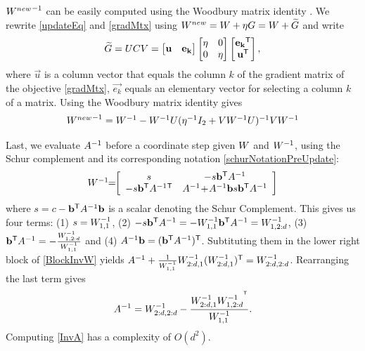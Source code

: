 \documentclass{article}
\begin{document}
${{W^{new}}}^{-1}$ can be easily computed using the Woodbury matrix
identity \cite{woodbury1950inverting}. We rewrite \eqref{updateEq} and \eqref{gradMtx} using ${{W^{new}}} = {W} + \eta G = {W}+{\widetilde{G}}$
and write
\begin{equation}
  {\widetilde{G}} = {U}{C}{V} = \left[ \begin{matrix}
      \mathbf{u} & \mathbf{e_k} \end{matrix} \right] \left[ \begin{matrix}
      \eta & 0 \\ 0 & \eta \end{matrix} \right] \left[ \begin{matrix}
      \mathbf{e_k}{}^\mathsf{T} \\ \mathbf{u}{}^\mathsf{T} \end{matrix} \right],
  \label{gradMtxWDB}
\end{equation}
where $\vec{u}$ is a column vector that equals the column $k$ of the gradient matrix of the objective \eqref{gradMtx},
$\vec{e_k}$ equals an elementary vector for selecting a column $k$ of
a matrix. 
Using the Woodbury matrix identity gives 
\begin{equation}
    \begin{array}{lcl}
    {{W^{new}}}^{-1} = 
    {W}^{-1} - {W}^{-1} {U} (\eta^{-1} I_2 + {V}     {W}^{-1} {U})^{-1} {V} {W}^{-1}
    \end{array}
    \label{InvWwdb}
\end{equation}

Last, we evaluate $A^{-1}$ before a coordinate step given ${W}$
and ${W}^{-1}$, using the Schur complement and its corresponding
notation \eqref{schurNotationPreUpdate}:
\begin{equation}
\begin{array}{l}
 {W}^{-1} \!\!=\!\! 
 \left[ \begin{array}{cc} s & -s \mathbf{b}{}^\mathsf{T} A^{-1} \\ -s \mathbf{b}{}^\mathsf{T} A^{-1}{}^\mathsf{T} &  A^{-1} \!+ \!A^{-1} \mathbf{b} s \mathbf{b}{}^\mathsf{T} A^{-1}  \end{array}  \right]
\end{array}
\label{BlockInvW}
\end{equation}
where $s= c-\mathbf{b}{}^\mathsf{T} A^{-1} \mathbf{b}$ is a scalar denoting the Schur Complement. This gives us four terms: (1) $s = {W}^{-1}_{1,1}$, (2)
$  -s \mathbf{b}{}^\mathsf{T} A^{-1} = -{W}^{-1}_{1,1} \mathbf{b}{}^\mathsf{T} A^{-1} = {W}^{-1}_{1,2:d}$, (3) $\mathbf{b}{}^\mathsf{T} A^{-1} = -\frac{{W}^{-1}_{1,2:d}}{{W}^{-1}_{1,1} }$ and (4) $A^{-1}\mathbf{b} = (\mathbf{b}{}^\mathsf{T} A^{-1}){}^\mathsf{T}$. Subtituting them in the lower right block of \eqref{BlockInvW} yields $A^{-1} + \frac{1}{{W}^{-1}_{1,1} } {W}^{-1}_{2:d,1} ({W}^{-1}_{2:d,1}){}^\mathsf{T} = {W}^{-1}_{2:d,2:d}$. Rearranging the last term gives
\begin{equation}
  A^{-1} = {W}^{-1}_{2:d,2:d}- \frac{{W}^{-1}_{2:d,1} {{W}^{-1}_{1,2:d}}^{{}^\mathsf{T}}}{{W}^{-1}_{1,1}}. 
  \label{InvA}
\end{equation}
Computing \eqref{InvA} has a complexity of $O(d^2)$.
\end{document}
